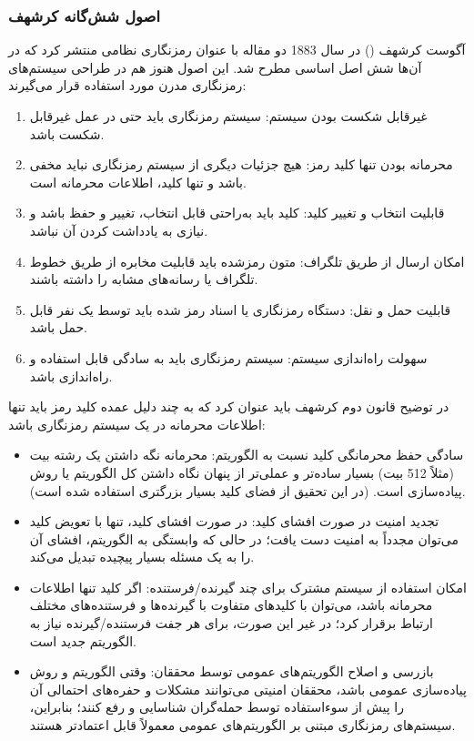 \subsubsection{اصول شش‌گانه کرشهف}
آگوست کرشهف (\protect{}) در سال 1883 دو مقاله با عنوان رمزنگاری نظامی منتشر کرد که در آن‌ها شش اصل اساسی مطرح شد. این اصول هنوز هم در طراحی سیستم‌های رمزنگاری مدرن مورد استفاده قرار می‌گیرند\cite{ref37}:

\begin{enumerate}
    \item غیرقابل شکست بودن سیستم: سیستم رمزنگاری باید حتی در عمل غیرقابل شکست باشد.
    \item محرمانه بودن تنها کلید رمز: هیچ جزئیات دیگری از سیستم رمزنگاری نباید مخفی باشد و تنها کلید، اطلاعات محرمانه است.
    \item قابلیت انتخاب و تغییر کلید: کلید باید به‌راحتی قابل انتخاب، تغییر و حفظ باشد و نیازی به یادداشت کردن آن نباشد.
    \item امکان ارسال از طریق تلگراف: متون رمزشده باید قابلیت مخابره از طریق خطوط تلگراف یا رسانه‌های مشابه را داشته باشند.
    \item قابلیت حمل و نقل: دستگاه رمزنگاری یا اسناد رمز شده باید توسط یک نفر قابل حمل باشد.
    \item سهولت راه‌اندازی سیستم: سیستم رمزنگاری باید به سادگی قابل استفاده و راه‌اندازی باشد.
\end{enumerate}

در توضیح قانون دوم کرشهف باید عنوان کرد که به چند دلیل عمده کلید رمز باید تنها اطلاعات محرمانه در یک سیستم رمزنگاری باشد:

\begin{itemize}
    \item سادگی حفظ محرمانگی کلید نسبت به الگوریتم: محرمانه نگه داشتن یک رشته بیت (مثلاً 512 بیت) بسیار ساده‌تر و عملی‌تر از پنهان نگاه داشتن کل الگوریتم یا روش پیاده‌سازی است. (در این تحقیق از فضای کلید بسیار بزرگتری استفاده شده است).
    \item تجدید امنیت در صورت افشای کلید: در صورت افشای کلید، تنها با تعویض کلید می‌توان مجدداً به امنیت دست یافت؛ در حالی که وابستگی به الگوریتم، افشای آن را به یک مسئله بسیار پیچیده تبدیل می‌کند.
    \item امکان استفاده از سیستم مشترک برای چند گیرنده/فرستنده: اگر کلید تنها اطلاعات محرمانه باشد، می‌توان با کلیدهای متفاوت با گیرنده‌ها و فرستنده‌های مختلف ارتباط برقرار کرد؛ در غیر این صورت، برای هر جفت فرستنده/گیرنده نیاز به الگوریتم جدید است.
    \item بازرسی و اصلاح الگوریتم‌های عمومی توسط محققان: وقتی الگوریتم و روش پیاده‌سازی عمومی باشد، محققان امنیتی می‌توانند مشکلات و حفره‌های احتمالی آن را پیش از سوءاستفاده توسط حمله‌گران شناسایی و رفع کنند؛ بنابراین، سیستم‌های رمزنگاری مبتنی بر الگوریتم‌های عمومی معمولاً قابل اعتمادتر هستند\cite{ref38}.
\end{itemize}

